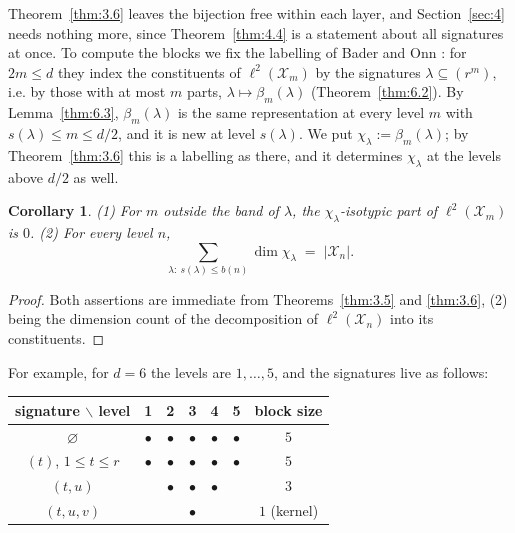 \documentclass[11pt]{article}
\numberwithin{equation}{section}
\theoremstyle{plain}
\newtheorem{corollary}[theorem]{Corollary}
\theoremstyle{definition}
\begin{document}
Theorem~\ref{thm:3.6} leaves the bijection free within each layer, and Section~\ref{sec:4} needs nothing
more, since Theorem~\ref{thm:4.4} is a statement about all signatures at once. To compute the
blocks we fix the labelling of Bader and Onn \cite[\S2]{BO12}: for $2m\le d$ they index the
constituents of $\ell^2(\mathcal{X}_m)$ by the signatures $\lambda\subseteq(r^m)$, i.e. by those
with at most $m$ parts, $\lambda\mapsto\beta_m(\lambda)$
(Theorem~\ref{thm:6.2}). By Lemma~\ref{thm:6.3}, $\beta_m(\lambda)$ is the same
representation at every level $m$ with $s(\lambda)\le m\le d/2$, and it is new at level
$s(\lambda)$. We put $\chi_\lambda:=\beta_m(\lambda)$; by Theorem~\ref{thm:3.6} this is a
labelling as there, and it determines $\chi_\lambda$ at the levels above $d/2$ as well.

\begin{corollary}\label{thm:3.7}
(1) For $m$ outside the band of $\lambda$, the
$\chi_\lambda$-isotypic part of $\ell^2(\mathcal{X}_m)$ is $0$. (2) For every level $n$,
\begin{equation}\label{eq:3.1}
\sum_{\lambda:\ s(\lambda)\le b(n)}\dim\chi_\lambda\;=\;|\mathcal{X}_n| .
\end{equation}
\end{corollary}

\begin{proof}
Both assertions are immediate from Theorems~\ref{thm:3.5} and \ref{thm:3.6}, (2) being the
dimension count of the decomposition of $\ell^2(\mathcal{X}_n)$ into its constituents.
\end{proof}

For example, for $d=6$ the levels are $1,\dots,5$, and the signatures live as follows:

\begin{center}
\begin{tabular}{ccccccc}
signature $\backslash$ level & 1 & 2 & 3 & 4 & 5 & block size \\
\hline
$\varnothing$ & $\bullet$ & $\bullet$ & $\bullet$ & $\bullet$ & $\bullet$ & $5$ \\
$(t)$, $1\le t\le r$ & $\bullet$ & $\bullet$ & $\bullet$ & $\bullet$ & $\bullet$ & $5$ \\
$(t,u)$ &  & $\bullet$ & $\bullet$ & $\bullet$ &  & $3$ \\
$(t,u,v)$ &  &  & $\bullet$ &  &  & $1$ (kernel) \\
\end{tabular}
\end{center}
\end{document}
